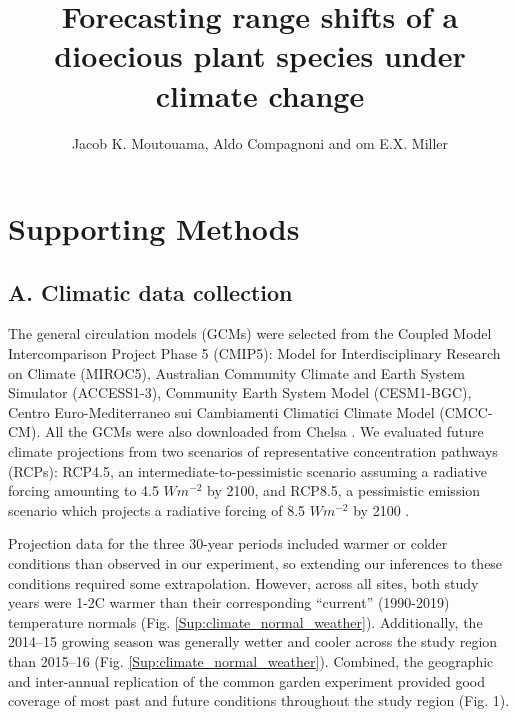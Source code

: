 \documentclass[9pt,twoside,lineno]{pnas-new}
\title{Forecasting range shifts of a dioecious plant species under climate change}
\author{Jacob K. Moutouama, Aldo Compagnoni and om E.X. Miller}
\begin{document}

\maketitle

\SItext


\section*{Supporting Methods}

\subsection*{A. Climatic data collection}
The general circulation models (GCMs) were selected from the Coupled Model Intercomparison Project Phase 5 (CMIP5): Model for Interdisciplinary Research on Climate (MIROC5), Australian Community Climate and Earth System Simulator (ACCESS1-3), Community Earth System Model (CESM1-BGC), Centro Euro-Mediterraneo sui Cambiamenti Climatici Climate Model (CMCC-CM).
All the GCMs were also downloaded from Chelsa \citep{sanderson2015representative}.
We evaluated future climate projections from two scenarios of representative concentration pathways (RCPs): RCP4.5, an intermediate-to-pessimistic scenario assuming a radiative forcing amounting to 4.5 $W m^{-2}$ by 2100, and RCP8.5, a pessimistic emission scenario which projects a radiative forcing of 8.5 $W m^{-2}$ by 2100 \citep{thomson2011rcp4, schwalm2020rcp8}. 

Projection data for the three 30-year periods included warmer or colder conditions than observed in our experiment, so extending our inferences to these conditions required some extrapolation. 
However, across all sites, both study years were 1-2\degree C warmer than their corresponding ``current'' (1990-2019) temperature normals (Fig. \ref{Sup:climate_normal_weather}). 
Additionally, the 2014--15 growing season was generally wetter and cooler across the study region than 2015--16 (Fig. \ref{Sup:climate_normal_weather}). 
Combined, the geographic and inter-annual replication of the common garden experiment provided good coverage of most past and future conditions throughout the study region (Fig. 1). 
\end{document}

